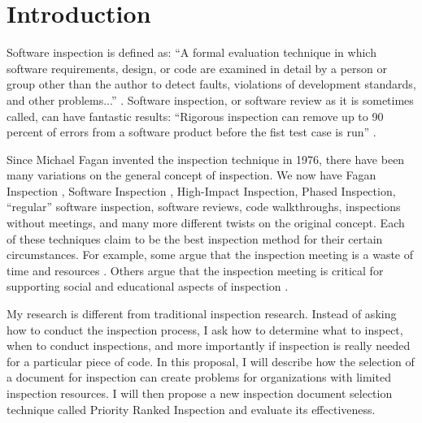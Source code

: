 

\chapter{Introduction}
Software inspection is defined as: ``A formal evaluation technique in which
software requirements, design, or code are examined in detail by a person
or group other than the author to detect faults, violations of development
standards, and other problems...'' \cite{Gilb93}. Software inspection, or
software review as it is sometimes called, can have fantastic results:
``Rigorous inspection can remove up to 90 percent of errors from a software
product before the fist test case is run'' \cite{Glass03, Bush90}.

Since Michael Fagan invented the inspection technique in 1976, there have
been many variations on the general concept of inspection. We now have
Fagan Inspection \cite{Fagan76}, Software Inspection \cite{Gilb93},
High-Impact Inspection, Phased Inspection, ``regular'' software inspection,
software reviews, code walkthroughs, inspections without meetings, and many
more different twists on the original concept.  Each of these techniques
claim to be the best inspection method for their certain circumstances. For
example, some argue that the inspection meeting is a waste of time and
resources \cite{Johnson97, Johnson98, Votta93}. Others argue that the
inspection meeting is critical for supporting social and educational
aspects of inspection \cite{Johnson98}.

My research is different from traditional inspection research. Instead of
asking how to conduct the inspection process, I ask how to determine what
to inspect, when to conduct inspections, and more importantly if inspection
is really needed for a particular piece of code. In this proposal, I will
describe how the selection of a document for inspection can create problems
for organizations with limited inspection resources. I will then propose a
new inspection document selection technique called Priority Ranked
Inspection and evaluate its effectiveness.



